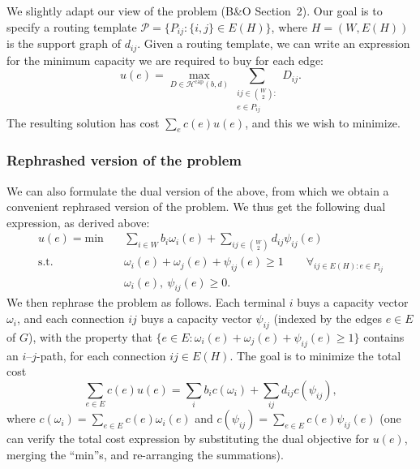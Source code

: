 We slightly adapt our view of the problem (B\&O Section~2).
Our goal is to specify a routing template $\mathcal P = \{ P_{ij} : \{i, j\} \in E(H) \}$, where $H = (W, E(H))$ is the support graph of $d_{ij}$.
Given a routing template, we can write an expression for the minimum capacity we are required to buy for each edge:
\[
    u(e) = \max_{D \in \mathcal H^\text{cap}(b, d)} \sum_{\substack{ij \in \binom W 2 :\\e \in P_{ij}}} D_{ij}.
\]
The resulting solution has cost $\sum_e c(e) u(e)$, and this we wish to minimize.

\subsubsection*{Rephrashed version of the problem}
We can also formulate the dual version of the above, from which we obtain a convenient rephrased version of the problem.
We thus get the following dual expression, as derived above:
\[
    \begin{split}
        u(e) = \text{min}\quad & \sum_{i \in W} b_i \omega_i(e) + \sum_{ij \in \binom W 2} d_{ij} \psi_{ij}(e) \\
        \text{s.t.}\quad & \omega_i(e) + \omega_j(e) + \psi_{ij}(e) \ge 1 \qquad \forall_{ij \in E(H) : e \in P_{ij}} \\
        & \omega_i(e),\ \psi_{ij}(e) \ge 0.
    \end{split}
\]
We then rephrase the problem as follows.
Each terminal $i$ buys a capacity vector $\omega_i$, and each connection $ij$ buys a capacity vector $\psi_{ij}$ (indexed by the edges $e \in E$ of $G$), with the property that $\{ e \in E : \omega_i(e) + \omega_j(e) + \psi_{ij}(e) \ge 1 \}$ contains an $i$--$j$-path, for each connection $ij \in E(H)$.
The goal is to minimize the total cost
\[
    \sum_{e \in E} c(e) u(e) = \sum_{i} b_i c(\omega_i) + \sum_{ij} d_{ij} c(\psi_{ij}),
\]
where $c(\omega_i) = \sum_{e \in E} c(e) \omega_i(e)$ and $c(\psi_{ij}) = \sum_{e \in E} c(e) \psi_{ij}(e)$ (one can verify the total cost expression by substituting the dual objective for $u(e)$, merging the ``min''s, and re-arranging the summations).


